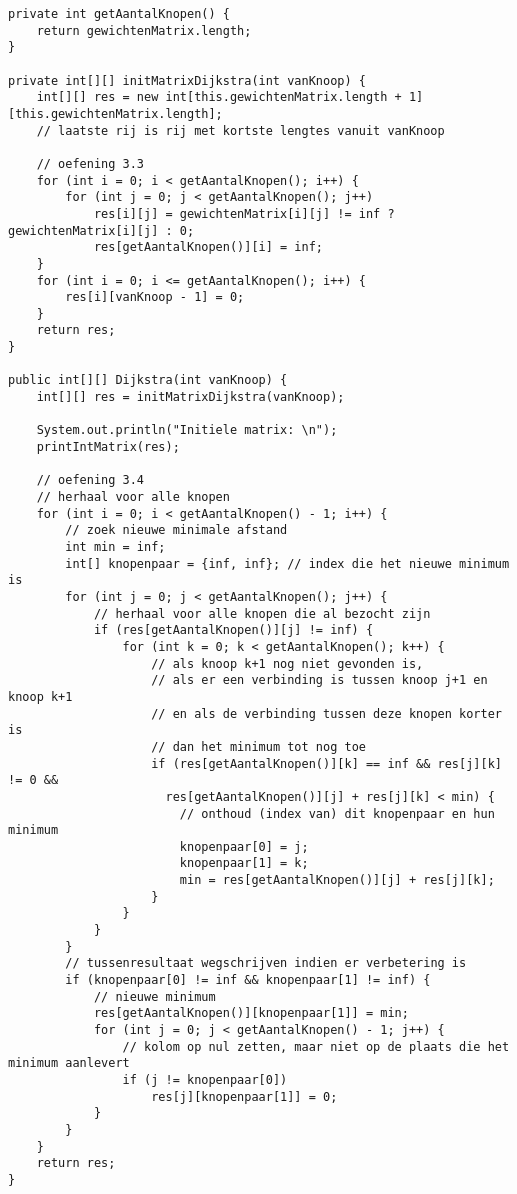 \begin{Oplossing}{9.3}
\begin{lstlisting}[caption={Dijkstra}, label=Dijkstra]
private int getAantalKnopen() {
    return gewichtenMatrix.length;
}

private int[][] initMatrixDijkstra(int vanKnoop) {
    int[][] res = new int[this.gewichtenMatrix.length + 1][this.gewichtenMatrix.length];
    // laatste rij is rij met kortste lengtes vanuit vanKnoop

    // oefening 3.3
    for (int i = 0; i < getAantalKnopen(); i++) {
        for (int j = 0; j < getAantalKnopen(); j++)
            res[i][j] = gewichtenMatrix[i][j] != inf ? gewichtenMatrix[i][j] : 0;
            res[getAantalKnopen()][i] = inf;
    }
    for (int i = 0; i <= getAantalKnopen(); i++) {
        res[i][vanKnoop - 1] = 0;
    }
    return res;
}

public int[][] Dijkstra(int vanKnoop) {
    int[][] res = initMatrixDijkstra(vanKnoop);

    System.out.println("Initiele matrix: \n");
    printIntMatrix(res);

    // oefening 3.4
    // herhaal voor alle knopen
    for (int i = 0; i < getAantalKnopen() - 1; i++) {
        // zoek nieuwe minimale afstand
        int min = inf;
        int[] knopenpaar = {inf, inf}; // index die het nieuwe minimum is
        for (int j = 0; j < getAantalKnopen(); j++) {
            // herhaal voor alle knopen die al bezocht zijn
            if (res[getAantalKnopen()][j] != inf) {
                for (int k = 0; k < getAantalKnopen(); k++) {
                    // als knoop k+1 nog niet gevonden is,
                    // als er een verbinding is tussen knoop j+1 en knoop k+1
                    // en als de verbinding tussen deze knopen korter is
                    // dan het minimum tot nog toe
                    if (res[getAantalKnopen()][k] == inf && res[j][k] != 0 &&
                      res[getAantalKnopen()][j] + res[j][k] < min) {
                        // onthoud (index van) dit knopenpaar en hun minimum
                        knopenpaar[0] = j;
                        knopenpaar[1] = k;
                        min = res[getAantalKnopen()][j] + res[j][k];
                    }
                }
            }
        }
        // tussenresultaat wegschrijven indien er verbetering is
        if (knopenpaar[0] != inf && knopenpaar[1] != inf) {
            // nieuwe minimum
            res[getAantalKnopen()][knopenpaar[1]] = min;
            for (int j = 0; j < getAantalKnopen() - 1; j++) {
                // kolom op nul zetten, maar niet op de plaats die het minimum aanlevert
                if (j != knopenpaar[0])
                    res[j][knopenpaar[1]] = 0;
            }
        }
    }
    return res;
}
\end{lstlisting}
\end{Oplossing}
